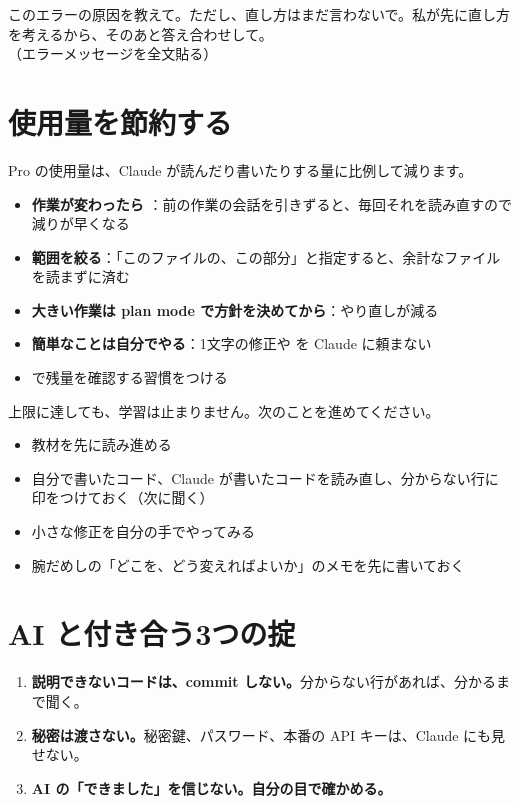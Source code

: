 \begin{prompt}[エラーを読む練習]
このエラーの原因を教えて。ただし、直し方はまだ言わないで。私が先に直し方を考えるから、そのあと答え合わせして。\\
（エラーメッセージを全文貼る）
\end{prompt}

\section{使用量を節約する}

Pro の使用量は、Claude が読んだり書いたりする量に比例して減ります。

\begin{itemize}
  \item \textbf{作業が変わったら }：前の作業の会話を引きずると、毎回それを読み直すので減りが早くなる
  \item \textbf{範囲を絞る}：「このファイルの、この部分」と指定すると、余計なファイルを読まずに済む
  \item \textbf{大きい作業は plan mode で方針を決めてから}：やり直しが減る
  \item \textbf{簡単なことは自分でやる}：1文字の修正や  を Claude に頼まない
  \item {} で残量を確認する習慣をつける
\end{itemize}

\begin{tip}[上限に達した日にできること]
上限に達しても、学習は止まりません。次のことを進めてください。
\begin{itemize}
  \item 教材を先に読み進める
  \item 自分で書いたコード、Claude が書いたコードを読み直し、分からない行に印をつけておく（次に聞く）
  \item 小さな修正を自分の手でやってみる
  \item 腕だめしの「どこを、どう変えればよいか」のメモを先に書いておく
\end{itemize}
\end{tip}

\section{AI と付き合う3つの掟}

\begin{tcolorbox}[kwbase,colback=kon!4,colframe=kon,title={3つの掟}]
\begin{enumerate}
  \item \textbf{説明できないコードは、commit しない。}分からない行があれば、分かるまで聞く。
  \item \textbf{秘密は渡さない。}秘密鍵、パスワード、本番の API キーは、Claude にも見せない。
  \item \textbf{AI の「できました」を信じない。自分の目で確かめる。}
\end{enumerate}
\end{tcolorbox}

